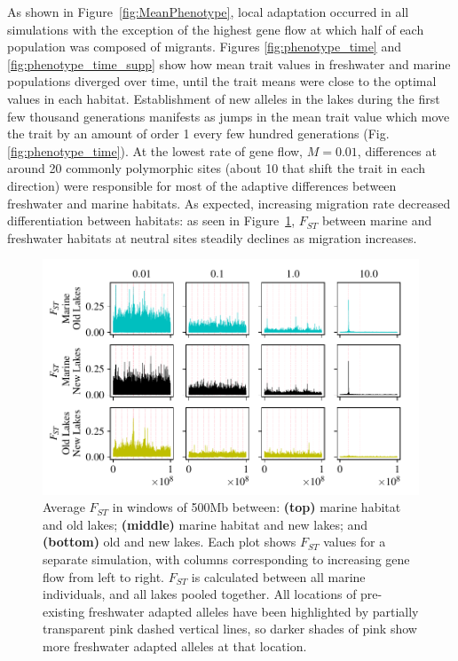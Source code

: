\documentclass{article}
\begin{document}
As shown in Figure~\ref{fig:MeanPhenotype}, local adaptation occurred in all simulations with the exception of the highest gene flow at which half of each population was composed of migrants. 
Figures \ref{fig:phenotype_time} and \ref{fig:phenotype_time_supp} show how mean trait values in freshwater and marine populations diverged over time, until the trait means were close to the optimal values in each habitat. 
Establishment of new alleles in the lakes during the first few thousand generations manifests as jumps in the mean trait value which move the trait by an amount of order 1 every few hundred generations (Fig. \ref{fig:phenotype_time}).
At the lowest rate of gene flow, $M = 0.01$, differences at around 20 commonly polymorphic sites (about 10 that shift the trait in each direction) were responsible for most of the adaptive differences between freshwater and marine habitats. 
As expected, increasing migration rate decreased differentiation between habitats: as seen in Figure~\ref{fig:Fst}, $F_{ST}$ between marine and freshwater habitats at neutral sites steadily declines as migration increases. 

\begin{figure}
    \begin{center}
        \includegraphics[width=\textwidth]{Final_Plots/Fst_Genome_faa.pdf}
          \caption{
        Average $F_{ST}$ in windows of 500Mb between:
        \textbf{(top)} marine habitat and old lakes;
        \textbf{(middle)} marine habitat and new lakes; and
        \textbf{(bottom)} old and new lakes.
        Each plot shows $F_{ST}$ values for a separate simulation,
        with columns corresponding to increasing gene flow from left to right.
        $F_{ST}$ is calculated between all marine individuals, and all lakes pooled together.
        All locations of pre-existing freshwater adapted alleles have been highlighted by 
        partially transparent pink dashed vertical lines, so darker shades of pink show more 
        freshwater adapted alleles at that location.
     } \label{fig:Fst}
    \end{center}
\end{figure}
\end{document}
